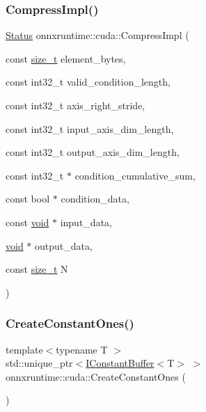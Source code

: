 \mbox{\label{namespaceonnxruntime_1_1cuda_ade6fe15dd248c66b252a7cf9c2b0744d}} 
\subsubsection{\texorpdfstring{Compress\+Impl()}{CompressImpl()}}
{\footnotesize\ttfamily \mbox{\hyperlink{classonnxruntime_1_1common_1_1Status}{Status}} onnxruntime\+::cuda\+::\+Compress\+Impl (\begin{DoxyParamCaption}\item[{const \mbox{\hyperlink{mlasi_8h_a503efbc1c6e50825320ad909366b78ab}{size\+\_\+t}}}]{element\+\_\+bytes,  }\item[{const int32\+\_\+t}]{valid\+\_\+condition\+\_\+length,  }\item[{const int32\+\_\+t}]{axis\+\_\+right\+\_\+stride,  }\item[{const int32\+\_\+t}]{input\+\_\+axis\+\_\+dim\+\_\+length,  }\item[{const int32\+\_\+t}]{output\+\_\+axis\+\_\+dim\+\_\+length,  }\item[{const int32\+\_\+t $\ast$}]{condition\+\_\+cumulative\+\_\+sum,  }\item[{const bool $\ast$}]{condition\+\_\+data,  }\item[{const \mbox{\hyperlink{mlasi_8h_a88f941d423cb2a819b70a1358982b1a6}{void}} $\ast$}]{input\+\_\+data,  }\item[{\mbox{\hyperlink{mlasi_8h_a88f941d423cb2a819b70a1358982b1a6}{void}} $\ast$}]{output\+\_\+data,  }\item[{const \mbox{\hyperlink{mlasi_8h_a503efbc1c6e50825320ad909366b78ab}{size\+\_\+t}}}]{N }\end{DoxyParamCaption})}

\mbox{\label{namespaceonnxruntime_1_1cuda_a855114def2d3cfc9e8f0ff2d267ff782}} 
\subsubsection{\texorpdfstring{Create\+Constant\+Ones()}{CreateConstantOnes()}}
{\footnotesize\ttfamily template$<$typename T $>$ \\
std\+::unique\+\_\+ptr$<$\mbox{\hyperlink{classonnxruntime_1_1cuda_1_1IConstantBuffer}{I\+Constant\+Buffer}}$<$T$>$ $>$ onnxruntime\+::cuda\+::\+Create\+Constant\+Ones (\begin{DoxyParamCaption}{ }\end{DoxyParamCaption})}

